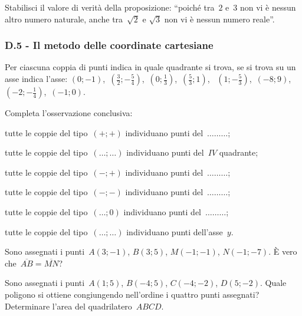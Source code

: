 \begin{esercizio}
\label{ese:D.17}
Stabilisci il valore di verità della proposizione: ``poiché tra~$2$ e~$3$ non vi è nessun altro numero naturale, anche tra~$\sqrt{2}$ e
$\sqrt{3}$ non vi è nessun numero reale''.
\end{esercizio}

\subsubsection*{D.5 - Il metodo delle coordinate cartesiane}
\begin{esercizio}
\label{ese:D.18}
Per ciascuna coppia di punti indica in quale quadrante si trova, se si trova su un asse indica l'asse:
$(0;-1)$, \,$\left(\frac{3}{2};-\frac{5}{4}\right)$, \,$\left(0;\frac{1}{3}\right)$, \,$\left(\frac{5}{3};1\right)$, \,
$\left(1;-\frac{5}{3}\right)$, \,$(-8;9)$, \,$\left(-2;-\frac{1}{4}\right)$, \,$(-1;0)$.

Completa l'osservazione conclusiva:
\begin{itemize*}
\item tutte le coppie del tipo~$(+;+)$ individuano punti del~$\ldots \ldots \ldots$;
\item tutte le coppie del tipo~$(\ldots;\ldots)$ individuano punti del~$IV$ quadrante;
\item tutte le coppie del tipo~$(-;+)$ individuano punti del~$\ldots \ldots \ldots$;
\item tutte le coppie del tipo~$(-;-)$ individuano punti del~$\ldots \ldots \ldots$;
\item tutte le coppie del tipo~$(\ldots;0)$ individuano punti del~$\ldots \ldots \ldots$;
\item tutte le coppie del tipo~$(\ldots;\ldots)$ individuano punti dell'asse~$y$.
\end{itemize*}
\end{esercizio}

\begin{esercizio}
\label{ese:D.19}
Sono assegnati i punti~$A(3;-1)$, $B(3;5)$, $M(-1;-1)$, $N(-1;-7)$. È vero che~$\overline{AB}=\overline{MN}$?
\end{esercizio}

\begin{esercizio}
\label{ese:D.20}
Sono assegnati i punti~$A(1;5)$, $B(-4;5)$, $C(-4;-2)$, $D(5;-2)$. Quale poligono si ottiene congiungendo nell'ordine i quattro
punti assegnati? Determinare l'area del quadrilatero~$ABCD$.
\end{esercizio}

